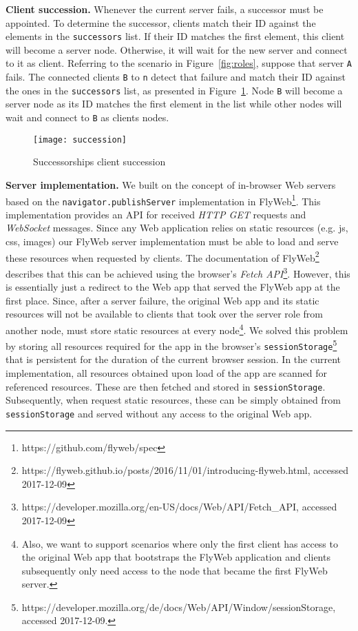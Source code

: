 \noindent\textbf{Client succession.} 
Whenever the current server fails, a successor must be appointed. 
To determine the successor, clients match their ID against the elements in the \texttt{successors} list.
If their ID matches the first element, this client will become a server node.
Otherwise, it will wait for the new server and connect to it as client.
Referring to the scenario in Figure~\ref{fig:roles}, suppose that server \texttt{A} fails. 
The connected clients \texttt{B} to \texttt{n} detect that failure and match their ID against the ones in the \texttt{successors} list, as presented in Figure~\ref{fig:succession}. Node \texttt{B} will become a server node as its ID matches the first element in the list while other nodes will wait and connect to \texttt{B} as clients nodes.

\begin{figure}[h]
    \centering
    \texttt{[image: succession]}
    \caption{Successorships client succession}
    \label{fig:succession}
\end{figure}

\noindent\textbf{Server implementation.}
We built on the concept of in-browser Web servers based on the \texttt{navigator.publishServer} implementation in FlyWeb\footnote{https://github.com/flyweb/spec}.
This implementation provides an API for received \textit{HTTP GET} requests and \textit{WebSocket} messages.
Since any Web application relies on static resources (e.g. js, css, images) our FlyWeb server implementation must be able to load and serve these resources when requested by clients.
The documentation of FlyWeb\footnote{https://flyweb.github.io/posts/2016/11/01/introducing-flyweb.html, accessed 2017-12-09} describes that this can be achieved using the browser's \textit{Fetch API}\footnote{https://developer.mozilla.org/en-US/docs/Web/API/Fetch\_API, accessed 2017-12-09}.
However, this is essentially just a redirect to the Web app that served the FlyWeb app at the first place.
Since, after a server failure, the original Web app and its static resources will not be available to clients that took over the server role from another node, \APIshort must store static resources at every node\footnote{Also, we want to support scenarios where only the first client has access to the original Web app that bootstraps the FlyWeb application and clients subsequently only need access to the node that became the first FlyWeb server.}.
We solved this problem by storing all resources required for the \APIshort app in the browser's \texttt{sessionStorage}\footnote{https://developer.mozilla.org/de/docs/Web/API/Window/sessionStorage, accessed 2017-12-09.} that is persistent for the duration of the current browser session.
In the current implementation, all resources obtained upon load of the app are scanned for referenced resources.
These are then fetched and stored in \texttt{sessionStorage}.
Subsequently, when \APIshort request static resources, these can be simply obtained from \texttt{sessionStorage} and served without any access to the original Web app.



